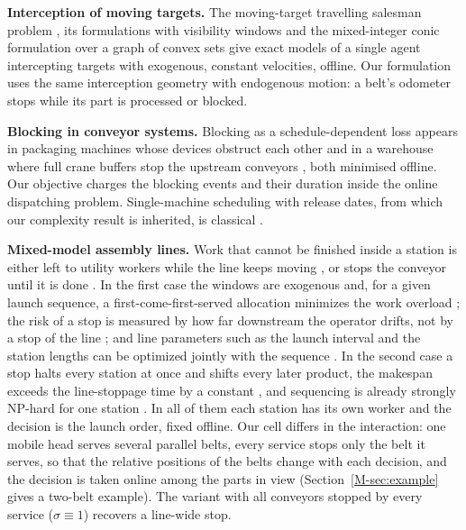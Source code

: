 \documentclass[11pt,a4paper]{article}
\theoremstyle{plain}
\theoremstyle{definition}
\theoremstyle{remark}
\begin{document}
\textbf{Interception of moving targets.} The moving-target travelling salesman problem
\cite{S06_Helvig2003}, its formulations with visibility windows \cite{S07_Stieber2022}
and the mixed-integer conic formulation over a graph of convex sets \cite{S08_Philip2024}
give exact models of a single agent intercepting targets with exogenous, constant
velocities, offline. Our formulation uses the same interception geometry with endogenous
motion: a belt's odometer stops while its part is processed or blocked.

\textbf{Blocking in conveyor systems.} Blocking as a schedule-dependent loss appears in
packaging machines whose devices obstruct each other \cite{S10_Briskorn2025} and in a
warehouse where full crane buffers stop the upstream conveyors \cite{S11_SalviaHornos2026},
both minimised offline. Our objective charges the blocking events and their duration
inside the online dispatching problem. Single-machine scheduling with release dates, from
which our complexity result is inherited, is classical \cite{Lenstra1977,Schrage1968,Baker1974}.

\textbf{Mixed-model assembly lines.} Work that cannot be finished inside a station is
either left to utility workers while the line keeps moving \cite{Yano1991,Tsai1995,Sarker2001},
or stops the conveyor until it is done \cite{Xiaobo2000,Tamura2011}. In the first case the
windows are exogenous and, for a given launch sequence, a first-come-first-served
allocation minimizes the work overload \cite{Yano1991}; the risk of a stop is measured by
how far downstream the operator drifts, not by a stop of the line \cite{Tsai1995}; and line
parameters such as the launch interval and the station lengths can be optimized jointly
with the sequence \cite{Sarker2001}. In the second case a stop halts every station at once
and shifts every later product, the makespan exceeds the line-stoppage time by a constant
\cite{Tamura2011}, and sequencing is already strongly NP-hard for one station
\cite{Tsai1995,Xiaobo2000}. In all of them each station has its own worker and the decision
is the launch order, fixed offline. Our cell differs in the interaction: one mobile head
serves several parallel belts, every service stops only the belt it serves, so that the
relative positions of the belts change with each decision, and the decision is taken online
among the parts in view (Section~\ref{M-sec:example} gives a two-belt example). The
variant with all conveyors stopped by every service ($\sigma\equiv1$) recovers a line-wide
stop.
\end{document}
